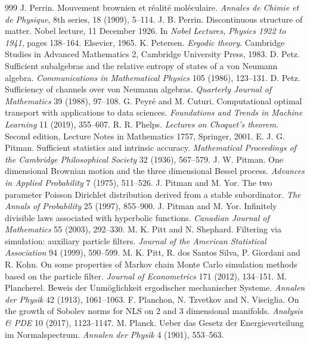 \begin{thebibliography}{999}
 J. Perrin. Mouvement brownien et r\'ealit\'e mol\'eculaire. \emph{Annales de Chimie et de Physique}, 8th series, 18 (1909), 5--114.
 J. B. Perrin. Discontinuous structure of matter. Nobel lecture, 11 December 1926. In \emph{Nobel Lectures, Physics 1922 to 1941}, pages 138--164. Elsevier, 1965.
 K. Petersen. \emph{Ergodic theory}. Cambridge Studies in Advanced Mathematics 2, Cambridge University Press, 1983.
 D. Petz. Sufficient subalgebras and the relative entropy of states of a von Neumann algebra. \emph{Communications in Mathematical Physics} 105 (1986), 123--131.
 D. Petz. Sufficiency of channels over von Neumann algebras. \emph{Quarterly Journal of Mathematics} 39 (1988), 97--108.
 G. Peyr\'e and M. Cuturi. Computational optimal transport with applications to data sciences. \emph{Foundations and Trends in Machine Learning} 11 (2019), 355--607.
 R. R. Phelps. \emph{Lectures on Choquet's theorem}. Second edition, Lecture Notes in Mathematics 1757, Springer, 2001.
 E. J. G. Pitman. Sufficient statistics and intrinsic accuracy. \emph{Mathematical Proceedings of the Cambridge Philosophical Society} 32 (1936), 567--579.
 J. W. Pitman. One dimensional Brownian motion and the three dimensional Bessel process. \emph{Advances in Applied Probability} 7 (1975), 511--526.
 J. Pitman and M. Yor. The two parameter Poisson Dirichlet distribution derived from a stable subordinator. \emph{The Annals of Probability} 25 (1997), 855--900.
 J. Pitman and M. Yor. Infinitely divisible laws associated with hyperbolic functions. \emph{Canadian Journal of Mathematics} 55 (2003), 292--330.
 M. K. Pitt and N. Shephard. Filtering via simulation: auxiliary particle filters. \emph{Journal of the American Statistical Association} 94 (1999), 590--599.
 M. K. Pitt, R. dos Santos Silva, P. Giordani and R. Kohn. On some properties of Markov chain Monte Carlo simulation methods based on the particle filter. \emph{Journal of Econometrics} 171 (2012), 134--151.
 M. Plancherel. Beweis der Unm\"oglichkeit ergodischer mechanischer Systeme. \emph{Annalen der Physik} 42 (1913), 1061--1063.
 F. Planchon, N. Tzvetkov and N. Visciglia. On the growth of Sobolev norms for NLS on 2 and 3 dimensional manifolds. \emph{Analysis \& PDE} 10 (2017), 1123--1147.
 M. Planck. Ueber das Gesetz der Energieverteilung im Normalspectrum. \emph{Annalen der Physik} 4 (1901), 553--563.

\end{thebibliography}
